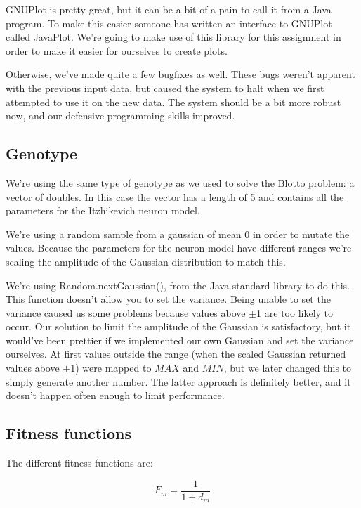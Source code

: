 \documentclass[a4paper]{article}
\begin{document}
GNUPlot is pretty great, but it can be a bit of a pain to call it from a Java program. To make this easier someone has written an interface to GNUPlot called JavaPlot. We're going to make use of this library for this assignment in order to make it easier for ourselves to create plots.

Otherwise, we've made quite a few bugfixes as well. These bugs weren't apparent with the previous input data, but caused the system to halt when we first attempted to use it on the new data. The system should be a bit more robust now, and our defensive programming skills improved.

\subsection{Genotype}
\label{sec:genotype}

We're using the same type of genotype as we used to solve the Blotto problem: a vector of doubles. In this case the vector has a length of 5 and contains all the parameters for the Itzhikevich neuron model.

We're using a random sample from a gaussian of mean 0 in order to mutate the values. Because the parameters for the neuron model have different ranges we're scaling the amplitude of the Gaussian distribution to match this.

We're using Random.nextGaussian(), from the Java standard library to do this. This function doesn't allow you to set the variance. Being unable to set the variance caused us some problems because values above $\pm$1 are too likely to occur. Our solution to limit the amplitude of the Gaussian is satisfactory, but it would've been prettier if we implemented our own Gaussian and set the variance ourselves. At first values outside the range (when the scaled Gaussian returned values above $\pm$1) were mapped to $MAX$ and $MIN$, but we later changed this to simply generate another number. The latter approach is definitely better, and it doesn't happen often enough to limit performance.

\subsection{Fitness functions}
\label{sec:fitfuncs}

The different fitness functions are:

\begin{equation}
  \label{eq:1}
  F_m = \frac{1}{1+d_m}
\end{equation}
\end{document}
